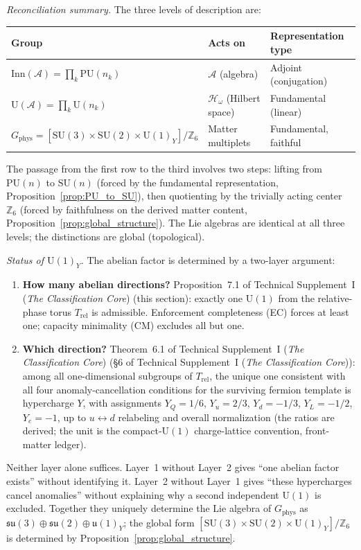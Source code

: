 \documentclass[11pt]{article}
\theoremstyle{definition}
\newcommand{\SU}{\mathrm{SU}}
\newcommand{\U}{\mathrm{U}}
\newcommand{\TSI}{Technical Supplement~I (\emph{The Classification Core})}
\begin{document}
\smallskip\noindent\textit{Reconciliation summary.}\quad
The three levels of description are:
\begin{center}\small
\begin{tabular}{@{}lll@{}}
\toprule
\textbf{Group} & \textbf{Acts on} & \textbf{Representation type} \\
\midrule
$\mathrm{Inn}(\mathcal{A}) = \prod_k \mathrm{PU}(n_k)$ &
  $\mathcal{A}$ (algebra) & Adjoint (conjugation) \\
$\mathrm{U}(\mathcal{A}) = \prod_k \mathrm{U}(n_k)$ &
  $\mathcal{H}_\omega$ (Hilbert space) & Fundamental (linear) \\
$G_{\mathrm{phys}} = [\SU(3){\times}\SU(2){\times}\U(1)_Y]/\mathbb{Z}_6$ &
  Matter multiplets & Fundamental, faithful \\
\bottomrule
\end{tabular}
\end{center}
The passage from the first row to the third involves two steps: lifting
from $\mathrm{PU}(n)$ to $\SU(n)$ (forced by the fundamental
representation, Proposition~\ref{prop:PU_to_SU}), then quotienting by
the trivially acting center $\mathbb{Z}_6$ (forced by faithfulness on
the derived matter content, Proposition~\ref{prop:global_structure}).
The Lie algebras are identical at all three levels; the distinctions are
global (topological).

\smallskip\noindent\textit{Status of $\U(1)_Y$.}\quad
The abelian factor is determined by a two-layer argument:
\begin{enumerate}[nosep,label=\textbf{Layer \arabic*:}]
  \item \textbf{How many abelian directions?}\quad
  Proposition~7.1 of \TSI{} (this section): exactly one $\U(1)$
  from the relative-phase torus $T_{\mathrm{rel}}$ is admissible.
  Enforcement completeness (EC) forces at least one; capacity
  minimality (CM) excludes all but one.

  \item \textbf{Which direction?}\quad
  Theorem~6.1 of \TSI{} (\S6 of \TSI{}): among all
  one-dimensional subgroups of $T_{\mathrm{rel}}$, the unique one
  consistent with all four anomaly-cancellation conditions for the
  surviving fermion template is hypercharge $Y$, with assignments
  $Y_Q = 1/6$, $Y_u = 2/3$, $Y_d = -1/3$, $Y_L = -1/2$, $Y_e = -1$,
  up to $u \leftrightarrow d$ relabeling and overall normalization
  (the ratios are derived; the unit is the compact-$\U(1)$
  charge-lattice convention, front-matter ledger).
\end{enumerate}
Neither layer alone suffices.  Layer~1 without Layer~2 gives ``one
abelian factor exists'' without identifying it.  Layer~2 without
Layer~1 gives ``these hypercharges cancel anomalies'' without
explaining why a second independent $\U(1)$ is excluded.  Together
they uniquely determine the Lie algebra of
$G_{\mathrm{phys}}$ as $\mathfrak{su}(3) \oplus \mathfrak{su}(2)
\oplus \mathfrak{u}(1)_Y$; the global form
$[\SU(3) \times \SU(2) \times \U(1)_Y] / \mathbb{Z}_6$ is determined
by Proposition~\ref{prop:global_structure}.
\end{document}
